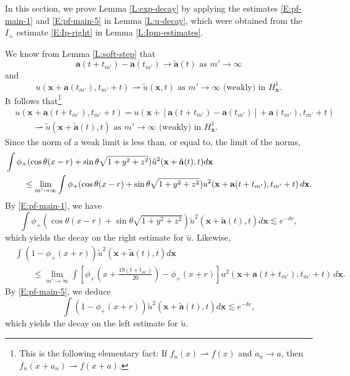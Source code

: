 \documentclass[12pt,letterpaper]{amsart}
\newcommand{\indentalign}{\hspace{0.3in}&\hspace{-0.3in}}
\theoremstyle{remark}
\numberwithin{equation}{section}
\numberwithin{theorem}{section}
\numberwithin{table}{section}
\begin{document}
In this section, we prove Lemma \ref{L:exp-decay} by applying the estimates \eqref{E:pf-main-1} and \eqref{E:pf-main-5} in Lemma \ref{L:u-decay}, which were obtained from the $I_+$ estimate \eqref{E:Ip-right} in Lemma \ref{L:Ipm-estimates}.

We know from Lemma \ref{L:soft-step} that
$$
\mathbf{a}(t+t_{m'}) - \mathbf{a}(t_{m'}) \to \tilde{\mathbf{a}}(t) \text{ as } m' \to \infty
$$
and
$$
u(\mathbf{x}+\mathbf{a}(t_{m'}),t_{m'}+t) \rightharpoonup \tilde u(\mathbf{x}, t) \text{ as } m'\to \infty  \text{ (weakly) in }H_{\mathbf{x}}^1.
$$
It follows that\footnote{This is the following elementary fact:  If $f_n(x)\rightharpoonup f(x)$ and $a_n\to a$, then $f_n(x+a_n) \rightharpoonup f(x+a)$.}
\begin{align*}
& u(\mathbf{x}+\mathbf{a}(t+t_{m'}) ,t_{m'}+t)  = u(\mathbf{x}+[\mathbf{a}(t+t_{m'}) - \mathbf{a}(t_{m'})] + \mathbf{a}(t_{m'}),t_{m'}+t) \\
& \qquad \rightharpoonup \tilde u(\mathbf{x}+\tilde{\mathbf{a}}(t), t) \text{ as } m'\to \infty \text{ (weakly) in }H_{\mathbf{x}}^1.
\end{align*}
Since the norm of a weak limit is less than, or equal to, the limit of the norms,
\begin{align*}
\indentalign \int \phi_+(\cos\theta(x-r) + \sin \theta \sqrt{1+y^2+z^2}) \tilde u^2(\mathbf{x}+\tilde{\mathbf{a}}(t),t) d\mathbf{x} \\
&\leq \lim_{m'\to \infty} \int \phi_+(\cos\theta(x-r) + \sin \theta \sqrt{1+y^2+z^2}) u^2(\mathbf{x}+\mathbf{a}(t+t_{m'}) ,t_{m'}+t)  \, d\mathbf{x}.
\end{align*}
By \eqref{E:pf-main-1}, we have
\begin{equation}
\label{E:tilde-right}
\int \phi_+(\cos\theta(x-r)+ \sin\theta \sqrt{1+y^2+z^2}) \tilde u^2(\mathbf{x}+\tilde{\mathbf{a}}(t),t) d\mathbf{x}  \lesssim e^{-\delta r},
\end{equation}
which yields the decay on the right estimate for $\tilde u$.  Likewise,
\begin{align*}
&\int (1- \phi_+(x+r)) \tilde u^2(\mathbf{x}+\tilde{\mathbf{a}}(t),t) d\mathbf{x} \\
& \qquad \leq \lim_{m'\to \infty} \int [\phi_+(x+\frac{19(t+t_{m'})}{20}) - \phi_+(x+r)] u^2(\mathbf{x}+\mathbf{a}(t+t_{m'}) ,t_{m'}+t)  \, d\mathbf{x}.
\end{align*}
By \eqref{E:pf-main-5}, we deduce
\begin{equation}
\label{E:tilde-left}
\int (1- \phi_+(x+r)) \tilde u^2(\mathbf{x}+\tilde{\mathbf{a}}(t),t) d\mathbf{x}  \lesssim e^{-\delta r},
\end{equation}
which yields the decay on the left estimate for $\tilde u$.  
\end{document}
